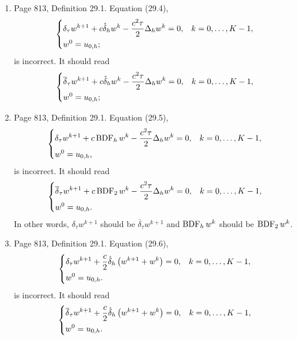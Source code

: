 \documentclass{book}
\begin{document}
\begin{enumerate}
	\item
Page 813, Definition 29.1. Equation (29.4),
  \begin{equation*}
    \begin{dcases}
      \delta_\tau w^{k+1} + c \mathring\delta_h w^k - \frac{c^2 \tau}2 \Delta_h w^k = 0, & k = 0, \ldots, K-1, \\
      w^0 = u_{0,h};     
    \end{dcases}
  \end{equation*}
is incorrect. It should read
  \begin{equation*}
    \begin{dcases}
\overline\delta_\tau w^{k+1} + c \mathring\delta_h w^k - \frac{c^2 \tau}2 \Delta_h w^k = 0, & k = 0, \ldots, K-1, \\
      w^0 = u_{0,h};     
    \end{dcases}
  \end{equation*}
  
  \item
Page 813, Definition 29.1. Equation (29.5),
    \begin{equation*}
    \begin{dcases}
      \delta_\tau w^{k+1} + c \operatorname{BDF}_h w^k - \frac{c^2 \tau}2 \Delta_h w^k = 0, & k = 0, \ldots, K-1, \\
      w^0 = u_{0,h},   
    \end{dcases}    
  \end{equation*}
is incorrect. It should read
    \begin{equation*}
    \begin{dcases}
\overline\delta_\tau w^{k+1} + c \operatorname{BDF}_2 w^k - \frac{c^2 \tau}2 \Delta_h w^k = 0, & k = 0, \ldots, K-1, \\
      w^0 = u_{0,h}.
    \end{dcases}    
  \end{equation*}
In other words, $\delta_\tau w^{k+1}$ should be $\overline\delta_\tau w^{k+1}$ and $\operatorname{BDF}_h w^k$ should be $\operatorname{BDF}_2 w^k$.

	\item
Page 813, Definition 29.1. Equation (29.6),
  \begin{equation*}
    \begin{dcases}
      \delta_\tau w^{k+1} + \frac{c}2 \mathring\delta_h \left( w^{k+1} + w^k \right) = 0, & k = 0, \ldots, K-1, \\
      w^0 = u_{0,h}.      
    \end{dcases}    
  \end{equation*}
is incorrect. It should read
  \begin{equation*}
    \begin{dcases}
\overline\delta_\tau w^{k+1} + \frac{c}2 \mathring\delta_h \left( w^{k+1} + w^k \right) = 0, & k = 0, \ldots, K-1, \\
      w^0 = u_{0,h}.      
    \end{dcases}    
  \end{equation*}
	

\end{enumerate}
\end{document}
